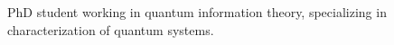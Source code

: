 

\begin{cvparagraph}

PhD student working in quantum information theory, specializing in
characterization of quantum systems.
\end{cvparagraph}
